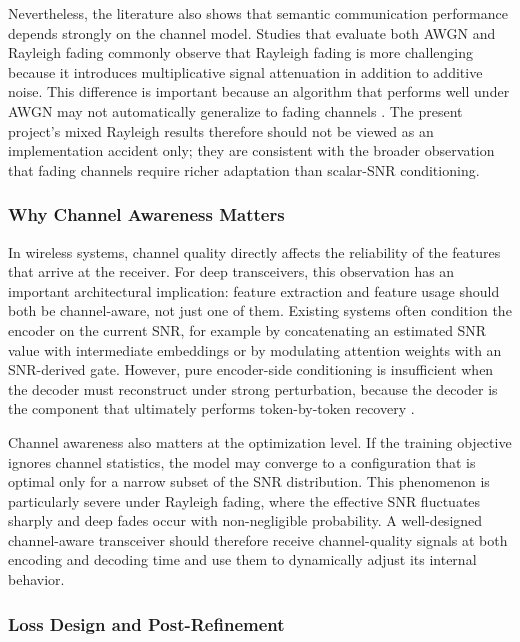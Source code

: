Nevertheless, the literature also shows that semantic communication performance depends strongly on the channel model. Studies that evaluate both AWGN and Rayleigh fading commonly observe that Rayleigh fading is more challenging because it introduces multiplicative signal attenuation in addition to additive noise. This difference is important because an algorithm that performs well under AWGN may not automatically generalize to fading channels \cite{zhou2021semantic_adaptive_ut}. The present project's mixed Rayleigh results therefore should not be viewed as an implementation accident only; they are consistent with the broader observation that fading channels require richer adaptation than scalar-SNR conditioning.

\subsubsection{Why Channel Awareness Matters}

In wireless systems, channel quality directly affects the reliability of the features that arrive at the receiver. For deep transceivers, this observation has an important architectural implication: feature extraction and feature usage should both be channel-aware, not just one of them. Existing systems often condition the encoder on the current SNR, for example by concatenating an estimated SNR value with intermediate embeddings or by modulating attention weights with an SNR-derived gate. However, pure encoder-side conditioning is insufficient when the decoder must reconstruct under strong perturbation, because the decoder is the component that ultimately performs token-by-token recovery \cite{goldsmith2005wireless, rappaport2002wireless}.

Channel awareness also matters at the optimization level. If the training objective ignores channel statistics, the model may converge to a configuration that is optimal only for a narrow subset of the SNR distribution. This phenomenon is particularly severe under Rayleigh fading, where the effective SNR fluctuates sharply and deep fades occur with non-negligible probability. A well-designed channel-aware transceiver should therefore receive channel-quality signals at both encoding and decoding time and use them to dynamically adjust its internal behavior.

\subsubsection{Loss Design and Post-Refinement}

